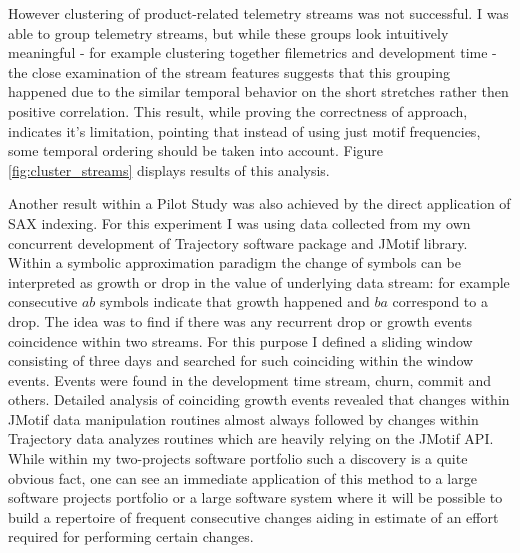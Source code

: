 \documentclass{sig-alternate}
\begin{document}
However clustering of product-related telemetry streams was not successful. I was able to group telemetry streams, but while these groups look intuitively meaningful - for example clustering together filemetrics and development time - the close examination of the stream features suggests that this grouping happened due to the similar temporal behavior on the short stretches rather then positive correlation. This result, while proving the correctness of approach, indicates it's limitation, pointing that instead of using just motif frequencies, some temporal ordering should be taken into account. Figure \ref{fig:cluster_streams} displays results of this analysis.

Another result within a Pilot Study was also achieved by the direct application of SAX indexing. For this experiment I was using data collected from my own concurrent development of Trajectory software package and JMotif library. Within a symbolic approximation paradigm the change of symbols can be interpreted as growth or drop in the value of underlying data stream: for example consecutive $ab$ symbols indicate that growth happened and $ba$ correspond to a drop. The idea was to find if there was any recurrent drop or growth events coincidence within two streams. For this purpose I defined a sliding window consisting of three days and searched for such coinciding within the window events. Events were found in the development time stream, churn, commit and others. Detailed analysis of coinciding growth events revealed that changes within JMotif data manipulation routines almost always followed by changes within Trajectory data analyzes routines which are heavily relying on the JMotif API. While within my two-projects software portfolio such a discovery is a quite obvious fact, one can see an immediate application of this method to a large software projects portfolio or a large software system where it will be possible to build a repertoire of frequent consecutive changes aiding in estimate of an effort required for performing certain changes.
\end{document}
